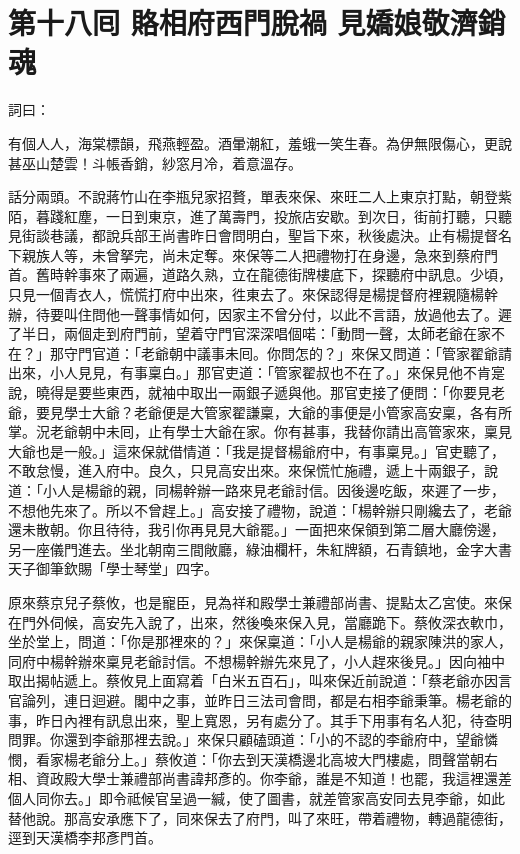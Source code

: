 
\chapter*{第十八囘 賂相府西門脫禍 見嬌娘敬濟銷魂}


詞曰：

\begin{myquote}
有個人人，海棠標韻，飛燕輕盈。酒暈潮紅，羞蛾一笑生春。為伊無限傷心，更說甚巫山楚雲！斗帳香銷，紗窓月冷，着意溫存。

\end{myquote}

話分兩頭。不說蔣竹山在李瓶兒家招贅，單表來保、來旺二人上東京打點，朝登紫陌，暮踐紅塵，一日到東京，進了萬壽門，投旅店安歇。到次日，街前打聽，只聽見街談巷議，都說兵部王尚書昨日會問明白，聖旨下來，秋後處決。止有楊提督名下親族人等，未曾拏完，尚未定奪。來保等二人把禮物打在身邊，急來到蔡府門首。舊時幹事來了兩遍，道路久熟，立在龍德街牌樓底下，探聽府中訊息。少頃，只見一個青衣人，慌慌打府中出來，徃東去了。來保認得是楊提督府裡親隨楊幹辦，待要叫住問他一聲事情如何，因家主不曾分付，以此不言語，放過他去了。遲了半日，兩個走到府門前，望着守門官深深唱個喏：「動問一聲，太師老爺在家不在？」那守門官道：「老爺朝中議事未囘。你問怎的？」來保又問道：「管家翟爺請出來，小人見見，有事稟白。」那官吏道：「管家翟叔也不在了。」來保見他不肯寔說，曉得是要些東西，就袖中取出一兩銀子遞與他。那官吏接了便問：「你要見老爺，要見學士大爺？老爺便是大管家翟謙稟，大爺的事便是小管家高安稟，各有所掌。況老爺朝中未囘，{}止有學士大爺在家。你有甚事，我替你請出高管家來，稟見大爺也是一般。」這來保就借情道：「我是提督楊爺府中，有事稟見。」官吏聽了，不敢怠慢，進入府中。良久，只見高安出來。來保慌忙施禮，遞上十兩銀子，說道：「小人是楊爺的親，同楊幹辦一路來見老爺討信。因後邊吃飯，來遲了一步，不想他先來了。所以不曾趕上。」高安接了禮物，說道：「楊幹辦只剛纔去了，老爺還未散朝。你且待待，我引你再見見大爺罷。」一面把來保領到第二層大廳傍邊，另一座儀門進去。坐北朝南三間敞廳，綠油欄杆，朱紅牌額，石青鎮地，金字大書天子御筆欽賜「學士琴堂」四字。

原來蔡京兒子蔡攸，也是寵臣，見為祥和殿學士兼禮部尚書、提點太乙宮使。來保在門外伺候，高安先入說了，出來，然後喚來保入見，當廳跪下。蔡攸深衣軟巾，坐於堂上，問道：「你是那裡來的？」來保稟道：「小人是楊爺的親家陳洪的家人，同府中楊幹辦來稟見老爺討信。不想楊幹辦先來見了，小人趕來後見。」因向袖中取出揭帖遞上。蔡攸見上面寫着「白米五百石」，叫來保近前說道：「蔡老爺亦因言官論列，連日迴避。閣中之事，並昨日三法司會問，都是右相李爺秉筆。楊老爺的事，昨日內裡有訊息出來，聖上寬恩，另有處分了。其手下用事有名人犯，待查明問罪。你還到李爺那裡去說。」來保只顧磕頭道：「小的不認的李爺府中，望爺憐憫，看家楊老爺分上。」蔡攸道：「你去到天漢橋邊北高坡大門樓處，問聲當朝右相、資政殿大學士兼禮部尚書諱邦彥的。{}你李爺，誰是不知道！也罷，我這裡還差個人同你去。」即令祗候官呈過一緘，使了圖書，就差管家高安同去見李爺，如此替他說。那高安承應下了，同來保去了府門，叫了來旺，帶着禮物，轉過龍德街，逕到天漢橋李邦彥門首。

